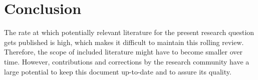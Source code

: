 \documentclass[conference]{IEEEtran}
\begin{document}
\section{Conclusion}
\label{sec:conclusion}

The rate at which potentially relevant literature for the present research question gets published is high, which makes it difficult to maintain this rolling review. 
Therefore, the scope of included literature might have to become smaller over time. 
However, contributions and corrections by the research community have a large potential to keep this document up-to-date and to assure its quality.
 



{\small


}
\end{document}
